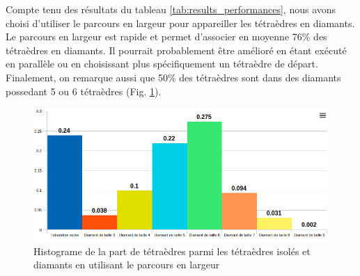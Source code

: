 \documentclass[a4paper,11pt,openany]{article}
\begin{document}
\noindent
Compte tenu des résultats du tableau \ref{tab:results_performances}, nous avons choisi d'utiliser le parcours en largeur pour appareiller les tétraèdres en diamants. Le parcours en largeur est rapide et permet d'associer en moyenne 76\% des tétraèdres en diamants. Il pourrait probablement être amélioré en étant exécuté en parallèle ou en choisissant plus spécifiquement un tétraèdre de départ. Finalement, on remarque aussi que 50\% des tétraèdres sont dans des diamants possedant 5 ou 6 tétraèdres (Fig. \ref{fig:bfs_starting}).
\begin{figure}[H]
\begin{center}
\includegraphics[scale=0.35]{Images/histograme}
\caption{Histograme de la part de tétraèdres parmi les tétraèdres isolés et diamants en utilisant le parcours en largeur}
\label{fig:bfs_starting}
\end{center}
\end{figure}

% 
% 
\end{document}
